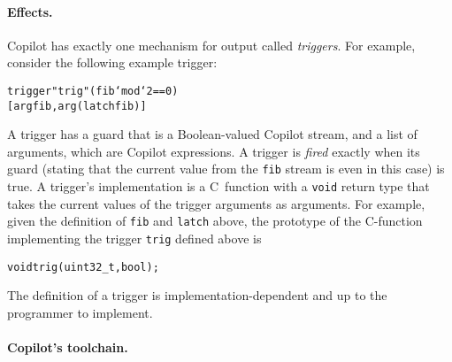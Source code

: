 \documentclass[9pt]{sigplanconf}
\newenvironment{code}{\begin{alltt}\footnotesize}{\end{alltt}}
\begin{document}
\paragraph{Effects.}
Copilot has exactly one mechanism for output called \emph{triggers}.  For
example, consider the following example trigger:
%
\begin{code}
trigger "trig" (fib `mod` 2 == 0) 
  [ arg fib, arg (latch fib) ]
\end{code}
A trigger has a guard that is a Boolean-valued Copilot stream, and a list of
arguments, which are Copilot expressions.  A trigger is \emph{fired} exactly
when its guard (stating that the current value from the {\tt fib} stream is
even in this case) is true.  A trigger's implementation is a C~function with a
{\tt void} return type that takes the current values of the trigger arguments as
arguments.  For example, given the definition of {\tt fib} and {\tt latch}
above, the prototype of the C-function implementing the trigger {\tt trig}
defined above is 
%
\begin{code}
void trig(uint32_t, bool);  
\end{code}
%
The definition of a trigger is implementation-dependent and up to
the programmer to implement.


\paragraph{Copilot's toolchain.}
\end{document}

